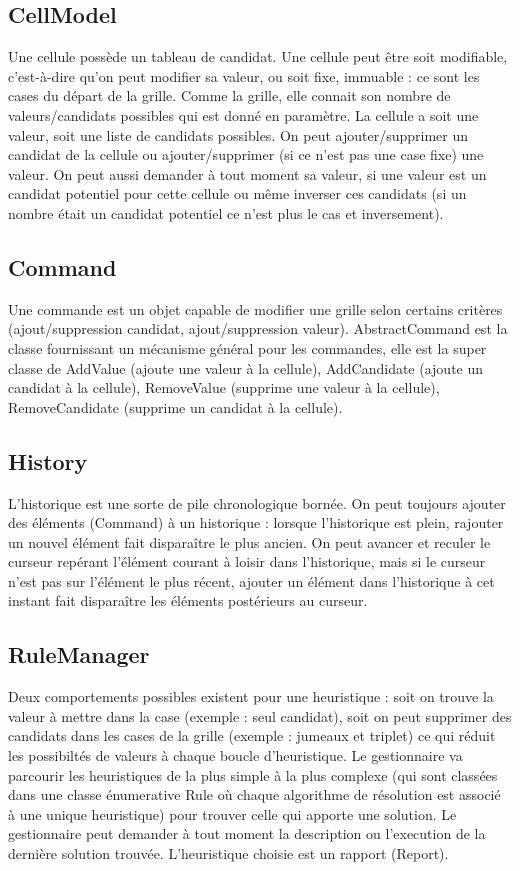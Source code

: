 \subsection{CellModel}
Une cellule possède un tableau de candidat.
Une cellule peut être soit modifiable, c'est-à-dire qu'on peut modifier sa valeur, ou soit fixe, immuable : 
ce sont les cases du départ de la grille. 
Comme la grille, elle connait son nombre de valeurs/candidats possibles qui est donné en paramètre.
La cellule a soit une valeur, soit une liste de candidats possibles. 
On peut ajouter/supprimer un candidat de la cellule ou ajouter/supprimer (si ce 
n'est pas une case fixe) une valeur. On peut aussi demander à tout moment sa valeur, si une valeur est un candidat
potentiel pour cette cellule ou même inverser ces candidats (si un nombre était un candidat potentiel ce n'est plus
le cas et inversement).

\subsection{Command}
Une commande est un objet capable de modifier une grille selon certains critères (ajout/suppression candidat, ajout/suppression valeur).
AbstractCommand est la classe fournissant un mécanisme général pour les commandes, elle est la super classe de 
AddValue (ajoute une valeur à la cellule), AddCandidate (ajoute un candidat à la cellule),
RemoveValue (supprime une valeur à la cellule), RemoveCandidate (supprime un candidat à la cellule).

\subsection{History}
L'historique est une sorte de pile chronologique bornée. On peut toujours ajouter des éléments (Command) à un historique : lorsque l'historique est plein, rajouter un nouvel élément fait disparaître le plus ancien. On peut avancer et 
reculer le curseur repérant l'élément courant à loisir dans l'historique, mais si le curseur n'est pas sur l'élément le 
plus récent, ajouter un élément dans l'historique à cet instant fait disparaître les éléments postérieurs au curseur.

\subsection{RuleManager}
Deux comportements possibles existent pour une heuristique : soit on trouve la valeur à mettre dans la case 
(exemple : seul candidat), soit on peut supprimer des candidats dans les cases de la grille (exemple : jumeaux et triplet)
ce qui réduit les possibiltés de valeurs à chaque boucle d'heuristique.
Le gestionnaire va parcourir les heuristiques de la plus simple à la plus complexe (qui sont classées dans une classe énumerative Rule où
chaque algorithme de résolution est associé à une unique heuristique) pour trouver celle qui apporte une solution.
Le gestionnaire peut demander à tout moment la description ou l'execution de la dernière solution trouvée.
L'heuristique choisie est un rapport (Report).

